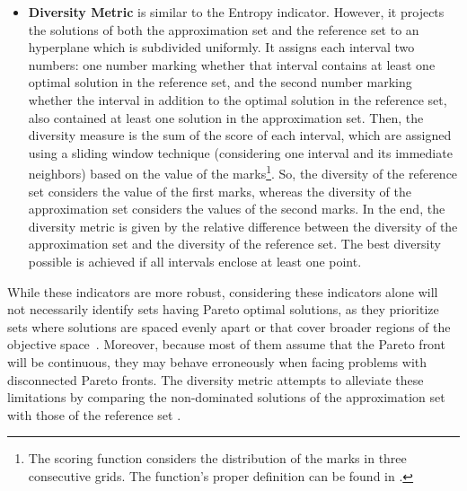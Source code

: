 \begin{itemize}
\item \textbf{Diversity Metric} is similar to the Entropy indicator. However, it projects the solutions of both the approximation set and the reference set to an hyperplane which is subdivided uniformly. It assigns each interval two numbers: one number marking whether that interval contains at least one optimal solution in the reference set, and the second number marking whether the interval in addition to the optimal solution in the reference set, also contained at least one solution in the approximation set. Then, the diversity measure is the sum of the score of each interval, which are assigned using a sliding window technique (considering one interval and its immediate neighbors) based on the value of the marks\footnote{The scoring function considers the distribution of the marks in three consecutive grids. The function's proper definition can be found in \cite{Deb2002DM}.}. So, the diversity of the reference set considers the value of the first marks, whereas the diversity of the approximation set considers the values of the second marks. In the end, the diversity metric is given by the relative difference between the diversity of the approximation set and the diversity of the reference set. The best diversity possible is achieved if all intervals enclose at least one point\cite{Deb2002DM}.

\end{itemize}

While these indicators are more robust, considering these indicators alone will not necessarily identify sets having Pareto optimal solutions, as they prioritize sets where solutions are spaced evenly apart or that cover broader regions of the objective space~\cite{Veldhuizen1999GD}. Moreover, because most of them assume that the Pareto front will be continuous, they may behave erroneously when facing problems with disconnected Pareto fronts. The diversity metric attempts to alleviate these limitations by comparing the non-dominated solutions of the approximation set with those of the reference set \cite{Deb2002DM}.

